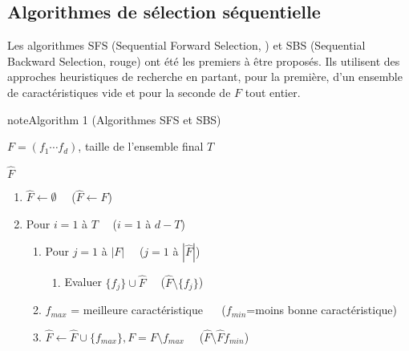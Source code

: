 \documentclass[letterpaper,10pt,english]{jupyterBook}
\begin{document}
\subsection{Algorithmes de sélection séquentielle}
\label{\detokenize{selection:algorithmes-de-selection-sequentielle}}
\sphinxAtStartPar
Les algorithmes SFS (Sequential Forward Selection, {\hyperref[\detokenize{selection:SFS}]{}}) et SBS (Sequential Backward Selection, {\hyperref[\detokenize{selection:SFS}]{}}\sphinxhyphen{}rouge) ont été les premiers à être proposés. Ils utilisent des approches heuristiques de recherche en partant, pour la première, d’un ensemble de caractéristiques vide et pour la seconde de  \(F\) tout entier.
\label{selection:SFS}
\begin{sphinxadmonition}{note}{Algorithm 1 (Algorithmes SFS et SBS)}



\sphinxAtStartPar
{} \(F = \left (f_1\cdots f_d\right )\), taille de l’ensemble final  \(T\)

\sphinxAtStartPar
{} \(\hat{F}\)
\begin{enumerate}
%
\item {} 
\sphinxAtStartPar
\(\hat{F}\leftarrow \emptyset\quad\) (\(\hat{F}\leftarrow F\))

\item {} 
\sphinxAtStartPar
Pour \(i=1\) à \( T\quad\) (\(i=1\) à \(d-T\))
\begin{enumerate}
%
\item {} 
\sphinxAtStartPar
Pour \(j=1\) à \( |{F}|\quad\) (\(j=1\) à \(|\hat{F}|\))
\begin{enumerate}
%
\item {} 
\sphinxAtStartPar
Evaluer \(\{f_j\}\cup \hat{F}\quad\) (\(\hat{F}\setminus \{f_j\}\))

\end{enumerate}

\item {} 
\sphinxAtStartPar
\(f_{max}\) = meilleure caractéristique \(\quad\) (\(f_{min}\)=moins bonne caractéristique)

\item {} 
\sphinxAtStartPar
\(\hat{F}\leftarrow\hat{F}\cup\{f_{max}\}, F=F\setminus f_{max}\quad\) (\(\hat{F}\setminus\hat{F}f_{min}\))

\end{enumerate}

\end{enumerate}
\end{sphinxadmonition}
\end{document}
